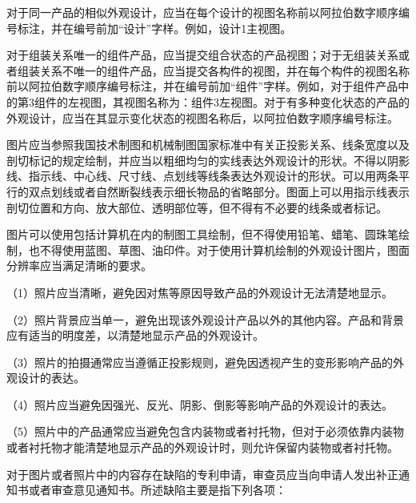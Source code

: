 对于同一产品的相似外观设计，应当在每个设计的视图名称前以阿拉伯数字顺序编号标注，并在编号前加“设计”字样。例如，设计1主视图。

对于组装关系唯一的组件产品，应当提交组合状态的产品视图；对于无组装关系或者组装关系不唯一的组件产品，应当提交各构件的视图，并在每个构件的视图名称前以阿拉伯数字顺序编号标注，并在编号前加“组件”字样。例如，对于组件产品中的第3组件的左视图，其视图名称为：组件3左视图。对于有多种变化状态的产品的外观设计，应当在其显示变化状态的视图名称后，以阿拉伯数字顺序编号标注。

图片应当参照我国技术制图和机械制图国家标准中有关正投影关系、线条宽度以及剖切标记的规定绘制，并应当以粗细均匀的实线表达外观设计的形状。不得以阴影线、指示线、中心线、尺寸线、点划线等线条表达外观设计的形状。可以用两条平行的双点划线或者自然断裂线表示细长物品的省略部分。图面上可以用指示线表示剖切位置和方向、放大部位、透明部位等，但不得有不必要的线条或者标记。

图片可以使用包括计算机在内的制图工具绘制，但不得使用铅笔、蜡笔、圆珠笔绘制，也不得使用蓝图、草图、油印件。对于使用计算机绘制的外观设计图片，图面分辨率应当满足清晰的要求。

{\setlength{\parindent}{17.1bp}（1）照片应当清晰，避免因对焦等原因导致产品的外观设计无法清楚地显示。\par}

{\setlength{\parindent}{17.1bp}（2）照片背景应当单一，避免出现该外观设计产品以外的其他内容。产品和背景应有适当的明度差，以清楚地显示产品的外观设计。\par}

{\setlength{\parindent}{17.1bp}（3）照片的拍摄通常应当遵循正投影规则，避免因透视产生的变形影响产品的外观设计的表达。\par}

{\setlength{\parindent}{17.1bp}（4）照片应当避免因强光、反光、阴影、倒影等影响产品的外观设计的表达。\par}

{\setlength{\parindent}{17.1bp}（5）照片中的产品通常应当避免包含内装物或者衬托物，但对于必须依靠内装物或者衬托物才能清楚地显示产品的外观设计时，则允许保留内装物或者衬托物。\par}

对于图片或者照片中的内容存在缺陷的专利申请，审查员应当向申请人发出补正通知书或者审查意见通知书。所述缺陷主要是指下列各项：

